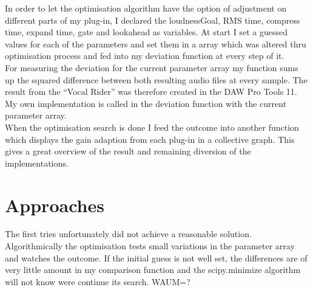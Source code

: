 In order to let the optimisation algorithm have the option of adjustment on different parts of my plug-in, I declared the loudnessGoal, RMS time, compress time, expand time, gate and lookahead as variables. At start I set a guessed values for each of the parameters and set them in a array which was altered thru optimisation process and fed into my deviation function at every step of it.\\
For measuring the deviation for the current parameter array my function sums up the squared difference between both resulting audio files at every sample. The result from the “Vocal Rider” was therefore created in the DAW Pro Tools 11. My own implementation is called in the deviation function with the current parameter array.\\
When the optimisation search is done I feed the outcome into another function which displays the gain adaption from each plug-in in a collective graph. This gives a great overview of the result and remaining diversion of the implementations.\\

\section{Approaches}

The first tries unfortunately did not achieve a reasonable solution. Algorithmically the optimisation tests small variations in the parameter array and watches the outcome. If the initial guess is not well set, the differences are of very little amount in my comparison function and the scipy.minimize algorithm will not know were continue its search. WAUM=?\\